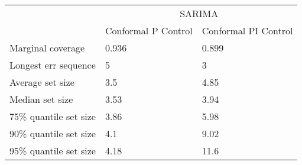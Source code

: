 \begin{tabular}{lll}
\toprule
& \multicolumn{2}{c}{SARIMA} \\
& Conformal P Control & Conformal PI Control \\
\midrule
Marginal coverage & 0.936 & 0.899 \\
Longest err sequence & 5 & 3 \\
Average set size & 3.5 & 4.85 \\
Median set size & 3.53 & 3.94 \\
75\% quantile set size & 3.86 & 5.98 \\
90\% quantile set size & 4.1 & 9.02 \\
95\% quantile set size & 4.18 & 11.6 \\
\bottomrule
\end{tabular}
